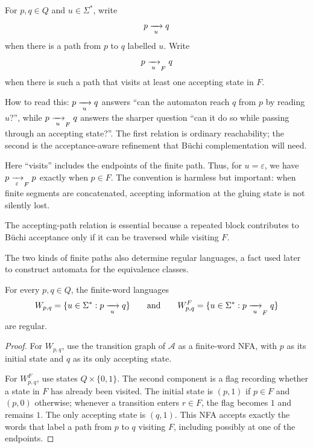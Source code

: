 \begin{definition}
\label{def:accepting-path-notation}
For $p,q\in Q$ and $u\in\Sigma^*$, write
\[
  p \xrightarrow[{\;u\;}]{} q
\]
when there is a path from $p$ to $q$ labelled $u$.  Write
\[
  p \xrightarrow[{\;u\;}]{}_{F} q
\]
when there is such a path that visits at least one accepting state in
$F$.
\end{definition}

How to read this: $p \xrightarrow[{\;u\;}]{} q$ answers ``can the automaton
reach $q$ from $p$ by reading $u$?'', while
$p \xrightarrow[{\;u\;}]{}_{F} q$ answers the sharper question ``can it do so
while passing through an accepting state?''.  The first relation is
ordinary reachability; the second is the acceptance-aware refinement that
B\"uchi complementation will need.

Here ``visits'' includes the endpoints of the finite path.  Thus, for
$u=\varepsilon$, we have $p\xrightarrow[{\;\varepsilon\;}]{}_{F}p$ exactly when
$p\in F$.  The convention is harmless but important: when finite
segments are concatenated, accepting information at the gluing state is
not silently lost.

The accepting-path relation is essential because a repeated block
contributes to B\"uchi acceptance only if it can be traversed while
visiting $F$.

The two kinds of finite paths also determine regular languages, a fact
used later to construct automata for the equivalence classes.

\begin{proposition}
\label{prop:regular-path-languages}
For every $p,q\in Q$, the finite-word languages
\[
  W_{p,q}=\{u\in\Sigma^*:p\xrightarrow[{\;u\;}]{}q\}
  \qquad\text{and}\qquad
  W^F_{p,q}=\{u\in\Sigma^*:p\xrightarrow[{\;u\;}]{}_{F}q\}
\]
are regular.
\end{proposition}

\begin{proof}
For $W_{p,q}$, use the transition graph of $\mathcal A$ as a
finite-word NFA, with $p$ as its initial state and $q$ as its only
accepting state.

For $W^F_{p,q}$, use states $Q\times\{0,1\}$.  The second component is
a flag recording whether a state in $F$ has already been visited.  The
initial state is $(p,1)$ if $p\in F$ and $(p,0)$ otherwise; whenever a
transition enters $r\in F$, the flag becomes $1$ and remains $1$.
The only accepting state is $(q,1)$.  This NFA accepts exactly the words
that label a path from $p$ to $q$ visiting $F$, including possibly at
one of the endpoints.
\end{proof}

